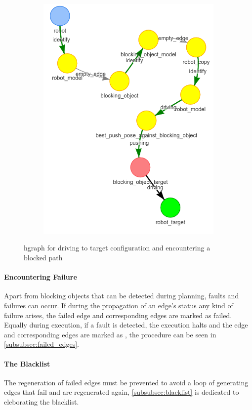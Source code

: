 \begin{figure}[H]
\begin{subfigure}{.3\textwidth}
    \caption{}\label{subfig:blocking_obj_5}
    \end{subfigure}
    \begin{subfigure}{.3\textwidth}
    \centering
    \includegraphics[width=\textwidth]{figures/connecting_nodes/blocking_obj_6}
    \caption{}\label{subfig:blocking_obj_6}
    \end{subfigure}
    \caption{\ac{hgraph} for driving to target configuration and encountering a blocked path}%
    \label{fig:blocking_obj_hgraph}
\end{figure}

\paragraph{Encountering Failure}%
 Apart from blocking objects that can be detected during planning, faults and failures can occur. If during the propagation of an edge's status any kind of failure arises, the failed edge and corresponding edges are marked as failed. Equally during execution, if a fault is detected, the execution halts and the edge and corresponding edges are marked as , the procedure can be seen in \cref{subsubsec:failed_edges}.\bs

\paragraph{The Blacklist}%
 The regeneration of failed edges must be prevented to avoid a loop of generating edges that fail and are regenerated again, \cref{subsubsec:blacklist} is dedicated to eleborating the blacklist.



